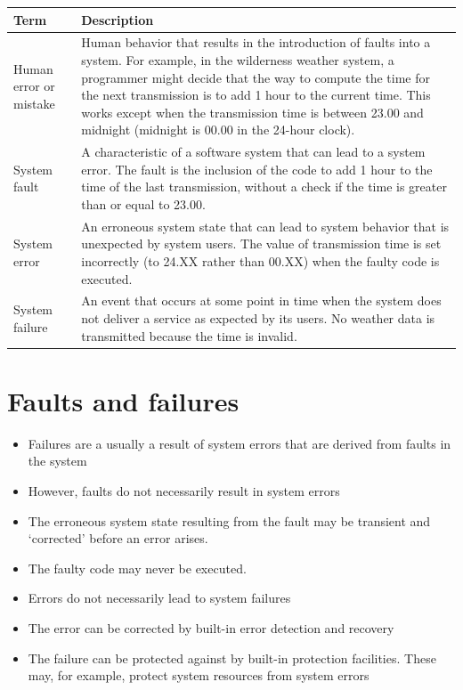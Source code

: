 \begin{table}[h!]
\centering
\begin{tabular}{ |p{3cm}|p{8cm}|  }
\hline
Term & Description \\
\hline
\hline
Human error or mistake & Human behavior that results in the introduction of faults into a system. For example, in the wilderness weather system, a programmer might decide that the way to compute the time for the next transmission is to add 1 hour to the current time. This works except when the transmission time is between 23.00 and midnight (midnight is 00.00 in the 24-hour clock).\\
\hline
System fault & A characteristic of a software system that can lead to a system error. The fault is the inclusion of the code to add 1 hour to the time of the last transmission, without a check if the time is greater than or equal to 23.00.\\
\hline
System error & An erroneous system state that can lead to system behavior that is unexpected by system users. The value of transmission time is set incorrectly (to 24.XX rather than 00.XX) when the faulty code is executed.\\
\hline
System failure & An event that occurs at some point in time when the system does not deliver a service as expected by its users. No weather data is transmitted because the time is invalid.\\
\hline
\end{tabular}

\label{table:T4_1}
\end{table}

\section{Faults and failures}
\begin{itemize}
\item Failures are a usually a result of system errors that are derived from faults in the system

\item However, faults do not necessarily result in system errors

  \item The erroneous system state resulting from the fault may be transient and ‘corrected’ before an error arises.
  \item The faulty code may never be executed.

\item Errors do not necessarily lead to system failures

  \item The error can be corrected by built-in error detection and recovery
  \item The failure can be protected against by built-in protection facilities. These may, for example, protect system resources from system errors


\end{itemize}
